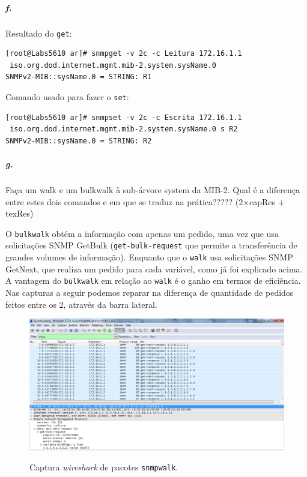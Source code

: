 \subparagraph{f.}
Resultado do \texttt{get}:
\begin{verbatim}
[root@Labs5610 ar]# snmpget -v 2c -c Leitura 172.16.1.1
 iso.org.dod.internet.mgmt.mib-2.system.sysName.0
SNMPv2-MIB::sysName.0 = STRING: R1
\end{verbatim}

Comando usado para fazer o \texttt{set}:
\begin{verbatim}
[root@Labs5610 ar]# snmpset -v 2c -c Escrita 172.16.1.1
 iso.org.dod.internet.mgmt.mib-2.system.sysName.0 s R2
SNMPv2-MIB::sysName.0 = STRING: R2
\end{verbatim}


\subparagraph{g.}
Faça um walk e um bulkwalk à sub-árvore system da MIB-2. Qual é a diferença entre estes dois comandos e em que se traduz na prática????? (2×capRes + texRes)

O \texttt{bulkwalk} obtém a informação com apenas um pedido, uma vez que usa solicitações SNMP GetBulk (\texttt{get-bulk-request} que permite a transferência de grandes volumes de informação). Enquanto que o \texttt{walk} usa solicitações SNMP GetNext, que realiza um pedido para cada variável, como já foi explicado acima.
A vantagem do \texttt{bulkwalk} em relação ao \texttt{walk} é o ganho em termos de eficiência. Nas capturas a seguir podemos reparar na diferença de quantidade de pedidos  feitos entre os 2, através da barra lateral.


\begin{figure}[h]
\centering
\includegraphics[width=1\textwidth, height=0.35\textheight]{5g_walk.png}
\label{fig:8-capturaWireshark}
\caption{Captura \emph{wireshark} de pacotes \texttt{snmpwalk}.}
\end{figure}

